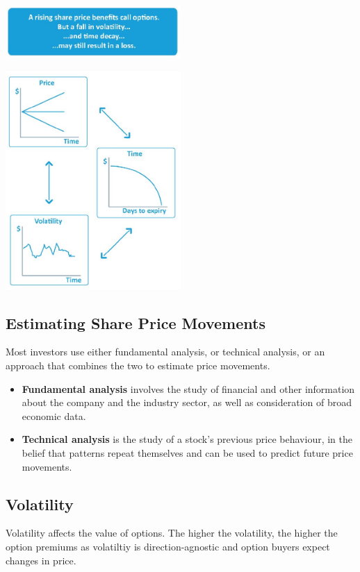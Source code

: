 \documentclass[12pt, a4paper]{article}
\begin{document}
\begin{center}
    \includegraphics[width=0.5\textwidth]{trading_strategy_note}
\end{center}

\begin{center}
    \includegraphics[width=0.5\textwidth]{options_strategy_relations}
\end{center}

\subsection*{Estimating Share Price Movements}
Most investors use either fundamental analysis, or technical analysis, or an approach that combines the two to estimate price movements.
\begin{itemize}
    \item \textbf{Fundamental analysis} involves the study of financial and other information about the company and the industry
          sector, as well as consideration of broad economic data.
    \item \textbf{Technical analysis} is the study of a stock's previous price behaviour, in the belief that patterns repeat themselves and
          can be used to predict future price movements.
\end{itemize}

\subsection*{Volatility}
Volatility affects the value of options.
The higher the volatility, the higher the option premiums as volatiltiy is direction-agnostic and option buyers expect changes in price.\\
\end{document}
